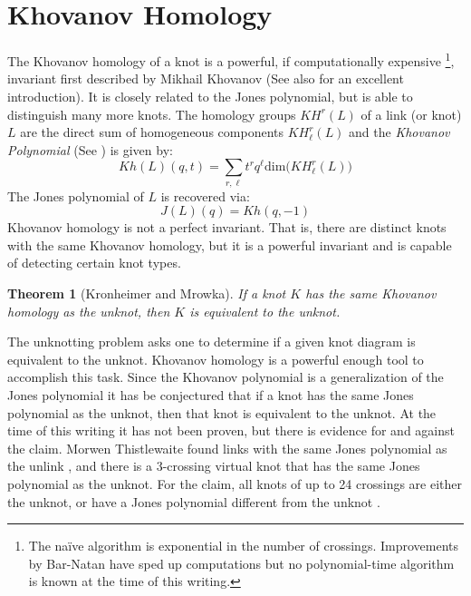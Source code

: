 \documentclass{article}
\theoremstyle{plain}
\newtheorem{theorem}{Theorem}
\begin{document}
    \section{Khovanov Homology}
        The Khovanov homology of a knot is a powerful, if computationally
        expensive%
        \footnote{The na\"{i}ve algorithm is exponential in the number of
        crossings. Improvements
        by Bar-Natan \cite{Khovanov1999CatJonesPoly} have sped up computations
        but no polynomial-time algorithm is known at the time of this writing.},
        invariant first described by Mikhail Khovanov
        \cite{Khovanov1999CatJonesPoly} (See also \cite{barnatan2002khovanov}
        for an excellent introduction). It is closely related to the Jones
        polynomial, but is able to distinguish many more knots. The homology
        groups $KH^{r}(L)$ of a link (or knot) $L$ are the direct sum of
        homogeneous components $KH_{\ell}^{r}(L)$ and the
        \textit{Khovanov Polynomial} (See \cite{KatlasKhoHo}) is given by:
        \begin{equation}
            Kh(L)(q,t)=
            \sum_{r,\ell}t^{r}q^{\ell}\textrm{dim}\big(KH_{\ell}^{r}(L)\big)
        \end{equation}
        The Jones polynomial of $L$ is recovered via:
        \begin{equation}
            J(L)(q)=Kh(q,-1)
        \end{equation}
        Khovanov homology is not a perfect invariant. That is, there are
        distinct knots with the same Khovanov homology, but it is a powerful
        invariant and is capable of detecting certain knot types.
        \begin{theorem}[Kronheimer and Mrowka]
            If a knot $K$ has the same Khovanov homology as the unknot, then $K$
            is equivalent to the unknot.
        \end{theorem}
        The unknotting problem asks one to determine if a given knot diagram is
        equivalent to the unknot. Khovanov homology is a powerful enough tool
        to accomplish this task. Since the Khovanov polynomial is a
        generalization of the Jones polynomial it has be conjectured that if a
        knot has the same Jones polynomial as the unknot, then that knot is
        equivalent to the unknot. At the time of this writing it has not been
        proven, but there is evidence for and against the claim. Morwen
        Thistlewaite found links with the same Jones polynomial as the unlink
        \cite{Thistlethwaite2001LINKSWT}, and there is a 3-crossing virtual
        knot that has the same Jones polynomial as the unknot. For the claim,
        all knots of up to 24 crossings are either the unknot, or have a
        Jones polynomial different from the unknot
        \cite{VerificationUnknotJonesConjUpTo24}.
\end{document}
